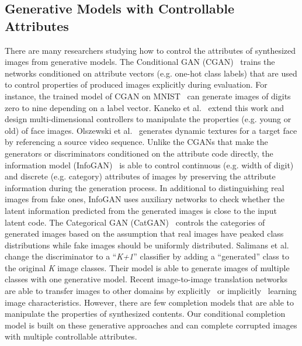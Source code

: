 \documentclass[acmtog,timestamp]{acmart}
\begin{document}
\subsection{Generative Models with Controllable Attributes}
There are many researchers studying how to control the attributes of synthesized images from generative models. The Conditional GAN (CGAN)~\cite{mirza2014conditional} trains the networks conditioned on attribute vectors (e.g. one-hot class labels) that are used to control properties of produced images explicitly during evaluation. For instance, the trained model of CGAN on MNIST~\cite{lecun1998mnist} can generate images of digits zero to nine depending on a label vector. Kaneko et al.~\cite{kaneko2017generative} extend this work and design multi-dimensional controllers to manipulate the properties (e.g. young or old) of face images. Olszewski et al.~\cite{olszewski2017realistic} generates dynamic textures for a target face by referencing a source video sequence. Unlike the CGANs that make the generators or discriminators conditioned on the attribute code directly, the information model (InfoGAN)~\cite{chen2016infogan} is able to control continuous (e.g. width of digit) and discrete (e.g. category) attributes of images by preserving the attribute information during the generation process. In additional to distinguishing real images from fake ones, InfoGAN uses auxiliary networks to check whether the latent information predicted from the generated images is close to the input latent code. The Categorical GAN (CatGAN)~\cite{springenberg2015unsupervised} controls the categories of generated images based on the assumption that real images have peaked class distributions while fake images should be uniformly distributed. Salimans et al.~\cite{salimans2016improved} change the discriminator to a ``\textit{K+1}'' classifier by adding a ``generated'' class to the original \textit{K} image classes. Their model is able to generate images of multiple classes with one generative model. Recent image-to-image translation networks are able to transfer images to other domains by explicitly~\cite{choi2017stargan} or implicitly~\cite{zhu2017unpaired,isola2016image} learning image characteristics. However, there are few completion models that are able to manipulate the properties of synthesized contents. Our conditional completion model is built on these generative approaches and can complete corrupted images with multiple controllable attributes.
\end{document}
